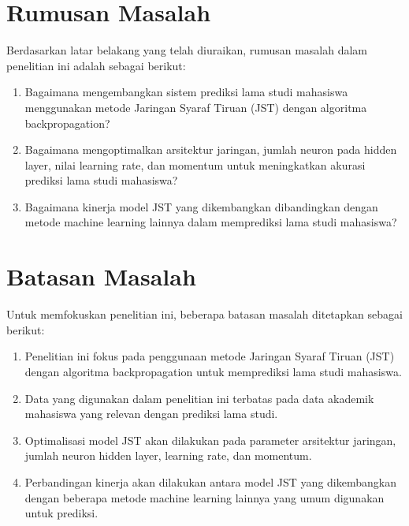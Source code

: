 \section{Rumusan Masalah}
Berdasarkan latar belakang yang telah diuraikan, rumusan masalah dalam penelitian ini adalah sebagai berikut:
    \begin{enumerate}
        \item Bagaimana mengembangkan sistem prediksi lama studi mahasiswa menggunakan metode Jaringan Syaraf Tiruan (JST) dengan algoritma backpropagation?
        \item Bagaimana mengoptimalkan arsitektur jaringan, jumlah neuron pada hidden layer, nilai learning rate, dan momentum untuk meningkatkan akurasi prediksi lama studi mahasiswa?
        \item Bagaimana kinerja model JST yang dikembangkan dibandingkan dengan metode machine learning lainnya dalam memprediksi lama studi mahasiswa?
    \end{enumerate}

\section{Batasan Masalah}
Untuk memfokuskan penelitian ini, beberapa batasan masalah ditetapkan sebagai berikut:
    \begin{enumerate}
        \item Penelitian ini fokus pada penggunaan metode Jaringan Syaraf Tiruan (JST) dengan algoritma backpropagation untuk memprediksi lama studi mahasiswa.
        \item Data yang digunakan dalam penelitian ini terbatas pada data akademik mahasiswa yang relevan dengan prediksi lama studi.
        \item Optimalisasi model JST akan dilakukan pada parameter arsitektur jaringan, jumlah neuron hidden layer, learning rate, dan momentum.
        \item Perbandingan kinerja akan dilakukan antara model JST yang dikembangkan dengan beberapa metode machine learning lainnya yang umum digunakan untuk prediksi.
    \end{enumerate}

